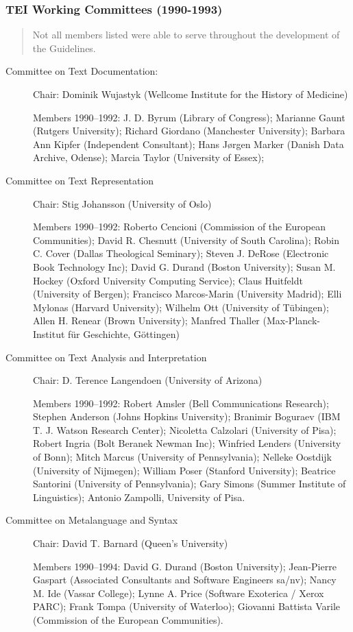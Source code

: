 \subsubsection[{TEI Working Committees (1990-1993)}]{TEI Working Committees (1990-1993)}\label{WGWC}
\begin{quote}
Not all members listed were able to serve throughout the development of the Guidelines.\end{quote}
\begin{description}

\item[{Committee on Text Documentation:}]\par
Chair: Dominik Wujastyk (Wellcome Institute for the History of Medicine) \par
Members 1990–1992: J. D. Byrum (Library of Congress); Marianne Gaunt (Rutgers University); Richard Giordano (Manchester University); Barbara Ann Kipfer (Independent Consultant); Hans Jørgen Marker (Danish Data Archive, Odense); Marcia Taylor (University of Essex);
\item[{Committee on Text Representation}]\par
Chair: Stig Johansson (University of Oslo) \par
Members 1990–1992: Roberto Cencioni (Commission of the European Communities); David R. Chesnutt (University of South Carolina); Robin C. Cover (Dallas Theological Seminary); Steven J. DeRose (Electronic Book Technology Inc); David G. Durand (Boston University); Susan M. Hockey (Oxford University Computing Service); Claus Huitfeldt (University of Bergen); Francisco Marcos-Marin (University Madrid); Elli Mylonas (Harvard University); Wilhelm Ott (University of Tübingen); Allen H. Renear (Brown University); Manfred Thaller (Max-Planck-Institut für Geschichte, Göttingen)
\item[{Committee on Text Analysis and Interpretation}]\par
Chair: D. Terence Langendoen (University of Arizona) \par
Members 1990–1992: Robert Amsler (Bell Communications Research); Stephen Anderson (Johns Hopkins University); Branimir Boguraev (IBM T. J. Watson Research Center); Nicoletta Calzolari (University of Pisa); Robert Ingria (Bolt Beranek Newman Inc); Winfried Lenders (University of Bonn); Mitch Marcus (University of Pennsylvania); Nelleke Oostdijk (University of Nijmegen); William Poser (Stanford University); Beatrice Santorini (University of Pennsylvania); Gary Simons (Summer Institute of Linguistics); Antonio Zampolli, University of Pisa.
\item[{Committee on Metalanguage and Syntax}]\par
Chair: David T. Barnard (Queen's University) \par
Members 1990–1994: David G. Durand (Boston University); Jean-Pierre Gaspart (Associated Consultants and Software Engineers sa/nv); Nancy M. Ide (Vassar College); Lynne A. Price (Software Exoterica / Xerox PARC); Frank Tompa (University of Waterloo); Giovanni Battista Varile (Commission of the European Communities).
\end{description} \par
